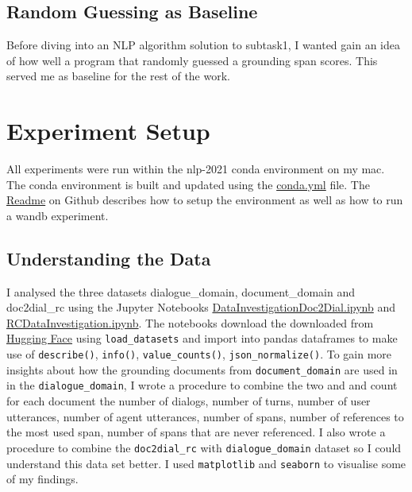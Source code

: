 \documentclass[11pt]{article}
\begin{document}
    \subsection*{Random Guessing as Baseline}\label{subsec:random-guessing-method}

    Before diving into an NLP algorithm solution to subtask1, I wanted gain an idea of how well a program that randomly guessed a
    grounding span scores. This served me as baseline for the rest of the work.




    \section{Experiment Setup}\label{sec:experiment-setup}

    All experiments were run within the nlp-2021 conda environment on my mac. The conda environment is built and updated using the
    \href{https://github.com/isabelladegen/nlp-2021/blob/main/conda.yml}{conda.yml} file. The
    \href{https://github.com/isabelladegen/nlp-2021}{Readme} on Github describes how to setup the environment as well
    as how to run a wandb experiment.

    \subsection{Understanding the Data}\label{subsec:understanding-the-data-experiment}
    I analysed the three datasets dialogue\_domain, document\_domain and doc2dial\_rc using the Jupyter Notebooks
    \href{https://github.com/isabelladegen/nlp-2021/blob/main/notebooks/DataInvestigationDoc2Dial.ipynb}{DataInvestigationDoc2Dial.ipynb}
    and \href{https://github.com/isabelladegen/nlp-2021/blob/main/notebooks/RCDataInvestigation.ipynb}{RCDataInvestigation.ipynb}.
    The notebooks download the downloaded from \href{https://huggingface.co/datasets/doc2dial}{Hugging Face}
    using \texttt{load\_datasets} and import into pandas dataframes \cite{reback2020pandas} to make use of
    \texttt{describe()}, \texttt{info()}, \texttt{value\_counts()}, \texttt{json\_normalize()}. To gain more insights
    about how the grounding documents from \texttt{document\_domain} are used in in the \texttt{dialogue\_domain},
    I wrote a procedure to combine the two and and count for each document the number of dialogs, number of turns, number of user utterances,
    number of agent utterances, number of spans, number of references to the most used span, number of spans that are never referenced.
    I also wrote a procedure to combine the \texttt{doc2dial\_rc} with \texttt{dialogue\_domain} dataset so I could understand
    this data set better. I used \texttt{matplotlib} \cite{matplotlib} and \texttt{seaborn} \cite{seaborn} to visualise
    some of my findings.
\end{document}
